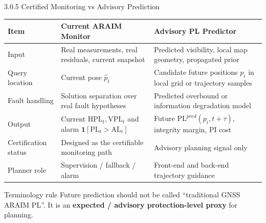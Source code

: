 \documentclass[10pt,aspectratio=169,xcolor=dvipsnames]{beamer}
\newcommand{\PL}{\mathrm{PL}}
\newcommand{\HPL}{\mathrm{HPL}}
\newcommand{\VPL}{\mathrm{VPL}}
\newcommand{\AL}{\mathrm{AL}}
\begin{document}
\begin{frame}{3.0.5 Certified Monitoring vs Advisory Prediction}
  \small
  \begin{table}\scriptsize
    \begin{tabular}{p{} p{} p{}}
      \toprule
      \textbf{Item} & \textbf{Current ARAIM Monitor} & \textbf{Advisory PL Predictor}\\
      \midrule
      Input & Real measurements, real residuals, current snapshot & Predicted visibility, local map geometry, propagated prior\\
      Query location & Current pose $\hat{p}_t$ & Candidate future positions $p_i$ in local grid or trajectory samples\\
      Fault handling & Solution separation over real fault hypotheses & Predicted overbound or information degradation model\\
      Output & Current $\HPL_t,\VPL_t$ and alarm $\mathbf{1}[\PL_t>\AL_t]$ & Future $\PL^{pred}(p_i,t+\tau)$, integrity margin, PI cost\\
      Certification status & Designed as the certifiable monitoring path & Advisory planning signal only\\
      Planner role & Supervision / fallback / alarm & Front-end and back-end trajectory guidance\\
      \bottomrule
    \end{tabular}
  \end{table}

  \begin{alertblock}{Terminology rule}
    \footnotesize Future prediction should not be called ``traditional GNSS ARAIM PL''. It is an \textbf{expected / advisory protection-level proxy} for planning.
  \end{alertblock}
\end{frame}

\end{document}
